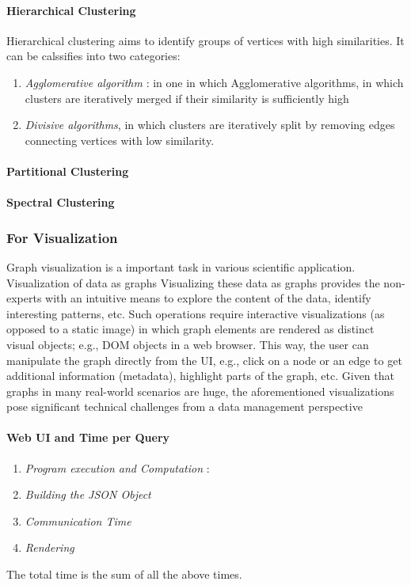 \paragraph{Hierarchical Clustering}
Hierarchical clustering aims to identify groups of vertices with high similarities. It can be calssifies into two categories:
 \begin{enumerate}
\item \textit{Agglomerative algorithm} : in one in which Agglomerative algorithms, in which clusters are iteratively merged if their similarity is sufficiently
high
\item \textit{Divisive algorithms}, in which clusters are iteratively
split by removing edges connecting vertices with
low similarity.
\end{enumerate} 

\paragraph{Partitional Clustering}

\paragraph{Spectral Clustering}





\subsubsection{For  Visualization}
Graph visualization is a important task in various scientific application. Visualization of data as graphs Visualizing these data
as graphs provides the non-experts with an intuitive means
to explore the content of the data, identify interesting patterns,
etc. Such operations require interactive visualizations
(as opposed to a static image) in which graph elements are
rendered as distinct visual objects; e.g., DOM objects in a
web browser. This way, the user can manipulate the graph
directly from the UI, e.g., click on a node or an edge to
get additional information (metadata), highlight parts of the
graph, etc. Given that graphs in many real-world scenarios
are huge, the aforementioned visualizations pose significant
technical challenges from a data management perspective

\paragraph{Web UI and Time per Query}
\begin{enumerate}
\item \textit{Program execution and Computation} : 
\item \textit{Building the JSON Object}
\item \textit{Communication Time}
\item \textit{Rendering }
\end{enumerate}
The total time is the sum of all the above times. 
